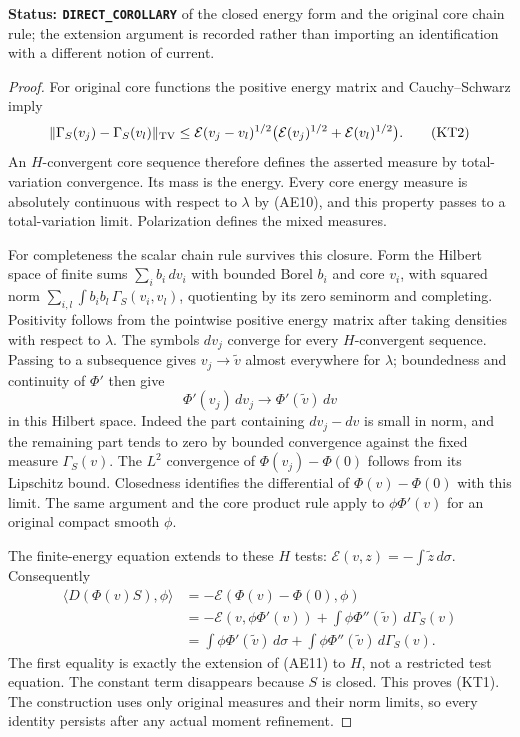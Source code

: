 \documentclass[11pt,a4paper]{article}
\numberwithin{equation}{section}
\theoremstyle{definition}
\theoremstyle{remark}
\begin{document}
\noindent\textbf{Status: \texttt{DIRECT\_COROLLARY}} of the closed
energy form and the original core chain rule; the extension argument
is recorded rather than importing an identification with a different
notion of current.

\begin{proof}
For original core functions the positive energy matrix and
Cauchy--Schwarz imply
\[
 \|\Gamma_S(v_j)-\Gamma_S(v_l)\|_{\rm TV}
 \le \mathcal E(v_j-v_l)^{1/2}
        \bigl(\mathcal E(v_j)^{1/2}+\mathcal E(v_l)^{1/2}\bigr).
 \tag{KT2}
\]
An $H$-convergent core sequence therefore defines the asserted
measure by total-variation convergence.  Its mass is the energy.
Every core energy measure is absolutely continuous with respect to
$\lambda$ by (AE10), and this property passes to a total-variation
limit.  Polarization defines the mixed measures.

For completeness the scalar chain rule survives this closure.
Form the Hilbert space of finite sums $\sum_i b_i\,dv_i$ with
bounded Borel $b_i$ and core $v_i$, with squared norm
$\sum_{i,l}\int b_i b_l\,\Gamma_S(v_i,v_l)$, quotienting by its
zero seminorm and completing.  Positivity follows from the
pointwise positive energy matrix after taking densities with
respect to $\lambda$.  The symbols $dv_j$ converge for every
$H$-convergent sequence.  Passing to a subsequence gives
$v_j\to\widetilde v$ almost everywhere for $\lambda$; boundedness
and continuity of $\Phi'$ then give
\[
                 \Phi'(v_j)\,dv_j\longrightarrow
                              \Phi'(\widetilde v)\,dv
\]
in this Hilbert space.  Indeed the part containing $dv_j-dv$
is small in norm, and the remaining part tends to zero by
bounded convergence against the fixed measure $\Gamma_S(v)$.
The $L^2$ convergence of $\Phi(v_j)-\Phi(0)$ follows from its
Lipschitz bound.  Closedness identifies the differential of
$\Phi(v)-\Phi(0)$ with this limit.  The same argument and the
core product rule apply to $\phi\Phi'(v)$ for an original
compact smooth $\phi$.

The finite-energy equation extends to these $H$ tests:
$\mathcal E(v,z)=-\int\widetilde z\,d\sigma$.
Consequently
\[
 \begin{split}
 \langle D(\Phi(v)S),\phi\rangle
  &=-\mathcal E(\Phi(v)-\Phi(0),\phi)\\
  &=-\mathcal E(v,\phi\Phi'(v))
                        +\int\phi\Phi''(\widetilde v)\,d\Gamma_S(v)\\
  &=\int\phi\Phi'(\widetilde v)\,d\sigma
                        +\int\phi\Phi''(\widetilde v)\,d\Gamma_S(v).
 \end{split}
\]
The first equality is exactly the extension of (AE11) to $H$,
not a restricted test equation.  The constant term disappears
because $S$ is closed.  This proves (KT1).  The construction uses
only original measures and their norm limits, so every identity
persists after any actual moment refinement.
\end{proof}
\end{document}

